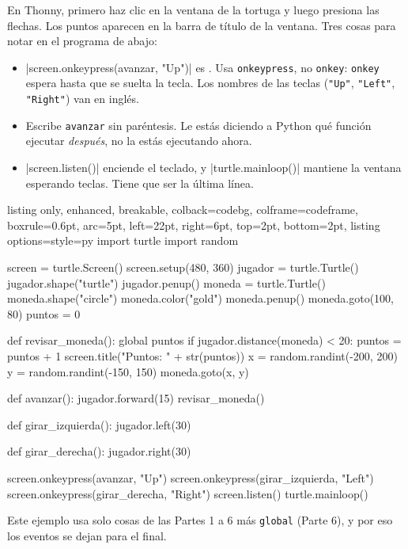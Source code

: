 En Thonny, primero haz clic en la ventana de la tortuga y luego presiona las flechas. Los puntos aparecen en la barra de título de la ventana. Tres cosas para notar en el programa de abajo:
\begin{itemize}
  \item \py|screen.onkeypress(avanzar, "Up")| es . Usa \texttt{onkeypress}, no \texttt{onkey}: \texttt{onkey} espera hasta que se suelta la tecla. Los nombres de las teclas (\texttt{"Up"}, \texttt{"Left"}, \texttt{"Right"}) van en inglés.
  \item Escribe \texttt{avanzar} sin paréntesis. Le estás diciendo a Python qué función ejecutar \emph{después}, no la estás ejecutando ahora.
  \item \py|screen.listen()| enciende el teclado, y \py|turtle.mainloop()| mantiene la ventana esperando teclas. Tiene que ser la última línea.
\end{itemize}
\begin{tcblisting}{listing only, enhanced, breakable, colback=codebg, colframe=codeframe, boxrule=0.6pt, arc=5pt,
  left=22pt, right=6pt, top=2pt, bottom=2pt, listing options={style=py}}
import turtle
import random

screen = turtle.Screen()
screen.setup(480, 360)
jugador = turtle.Turtle()
jugador.shape("turtle")
jugador.penup()
moneda = turtle.Turtle()
moneda.shape("circle")
moneda.color("gold")
moneda.penup()
moneda.goto(100, 80)
puntos = 0

def revisar_moneda():
    global puntos
    if jugador.distance(moneda) < 20:
        puntos = puntos + 1
        screen.title("Puntos: " + str(puntos))
        x = random.randint(-200, 200)
        y = random.randint(-150, 150)
        moneda.goto(x, y)

def avanzar():
    jugador.forward(15)
    revisar_moneda()

def girar_izquierda():
    jugador.left(30)

def girar_derecha():
    jugador.right(30)

screen.onkeypress(avanzar, "Up")
screen.onkeypress(girar_izquierda, "Left")
screen.onkeypress(girar_derecha, "Right")
screen.listen()
turtle.mainloop()
\end{tcblisting}

Este ejemplo usa solo cosas de las Partes 1 a 6 más \texttt{global} (Parte 6), y por eso los eventos se dejan para el final.

